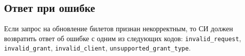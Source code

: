 \subsection{Ответ при ошибке}\label{REQRESP.Refresh.Error}

Если запрос на обновление билетов признан некорректным, то СИ должен возвратить 
ответ об ошибке с одним из следующих кодов: 
\lstinline{invalid_request},
\lstinline{invalid_grant},
\lstinline{invalid_client}, 
\lstinline{unsupported_grant_type}. 



